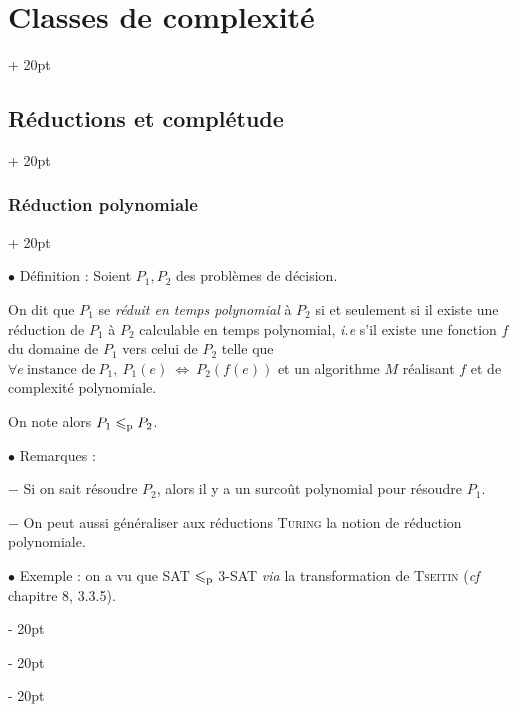 \documentclass[a4paper, 12pt, twoside]{article}
\newcommand{\ssi}{\ \Leftrightarrow \ }
\renewcommand{\le}{\leqslant}
\newcommand{\ind}[1][20pt]{\advance\leftskip + #1}
\newcommand{\deind}[1][20pt]{\advance\leftskip - #1}
\newenvironment{indt}[2][20pt]{#2 \par \ind[#1]}{\par \deind} %
\begin{document}
\begin{indt}{\section{Classes de complexité}}
        \vspace{12pt}
        
        \begin{indt}{\subsection{Réductions et complétude}}
            \begin{indt}{\subsubsection{Réduction polynomiale}}
                \label{2.3.1}

                $\bullet$ Définition : Soient $P_1, P_2$ des problèmes de décision.

                On dit que $P_1$ se \emph{réduit en temps polynomial} à $P_2$ si et seulement si il existe une réduction de $P_1$ à $P_2$ calculable en temps polynomial, \textit{i.e} s'il existe une fonction $f$ du domaine de $P_1$ vers celui de $P_2$ telle que $\forall e\ \text{instance de}\ P_1,\ P_1(e) \ssi P_2(f(e))$ et un algorithme $M$ réalisant $f$ et de complexité polynomiale.

                On note alors $P_1 \le_{\rm p} P_2$.

                \vspace{12pt}
                
                $\bullet$ Remarques :

                $-$ Si on sait résoudre $P_2$, alors il y a un surcoût polynomial pour résoudre $P_1$.

                $-$ On peut aussi généraliser aux réductions \textsc{Turing} la notion de réduction polynomiale.

                \vspace{12pt}
                
                $\bullet$ Exemple : on a vu que SAT $\le_{\rm p}$ 3-SAT \textit{via} la transformation de \textsc{Tseitin} (\textit{cf} chapitre 8, 3.3.5).


\end{indt}
\end{indt}
\end{indt}
\end{document}
